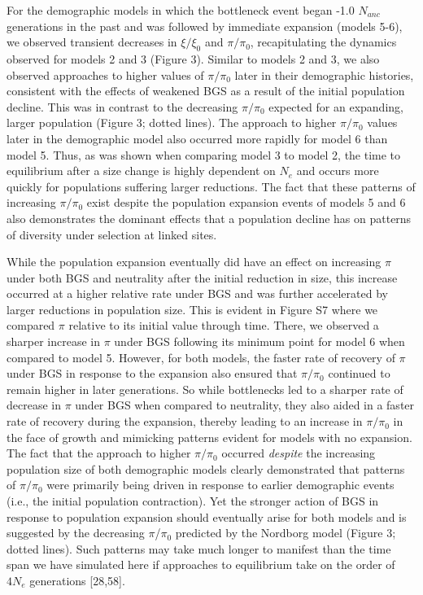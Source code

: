 \documentclass[9pt,twocolumn,twoside]{rilabRxiv}
\begin{document}
For the demographic models in which the bottleneck event began -1.0
$N_{anc}$ generations in the past and was followed by
immediate expansion (models 5-6), we observed transient decreases in
$\xi/\xi_0$ and $\pi/\pi_0$, recapitulating the
dynamics observed for models 2 and 3 (Figure 3). Similar to models 2 and
3, we also observed approaches to higher values of $\pi/\pi_0$
later in their demographic histories, consistent with the effects of
weakened BGS as a result of the initial population decline. This was in
contrast to the decreasing $\pi/\pi_0$ expected for an
expanding, larger population (Figure 3; dotted lines). The approach to
higher $\pi/\pi_0$ values later in the demographic model also
occurred more rapidly for model 6 than model 5. Thus, as was shown when
comparing model 3 to model 2, the time to equilibrium after a size
change is highly dependent on $N_e$ and occurs more
quickly for populations suffering larger reductions. The fact that these
patterns of increasing $\pi/\pi_0$ exist despite the population
expansion events of models 5 and 6 also demonstrates the dominant
effects that a population decline has on patterns of diversity under
selection at linked sites.

While the population expansion eventually did have an effect on
increasing $\pi$ under both BGS and neutrality after the initial reduction
in size, this increase occurred at a higher relative rate under BGS and
was further accelerated by larger reductions in population size. This is
evident in Figure S7 where we compared $\pi$ relative to its initial value
through time. There, we observed a sharper increase in $\pi$ under BGS
following its minimum point for model 6 when compared to model 5.
However, for both models, the faster rate of recovery of $\pi$ under BGS in
response to the expansion also ensured that $\pi/\pi_0$
continued to remain higher in later generations. So while bottlenecks
led to a sharper rate of decrease in $\pi$ under BGS when compared to
neutrality, they also aided in a faster rate of recovery during the
expansion, thereby leading to an increase in $\pi/\pi_0$ in the
face of growth and mimicking patterns evident for models with no
expansion. The fact that the approach to higher $\pi/\pi_0$
occurred \emph{despite} the increasing population size of both
demographic models clearly demonstrated that patterns of
$\pi/\pi_0$ were primarily being driven in response to earlier
demographic events (i.e., the initial population contraction). Yet the
stronger action of BGS in response to population expansion should
eventually arise for both models and is suggested by the decreasing $\pi$/$\pi_0$ predicted by the Nordborg model (Figure 3; dotted
lines). Such patterns may take much longer to manifest than the time
span we have simulated here if approaches to equilibrium take on the
order of $4N_e$ generations [28,58].
\end{document}
